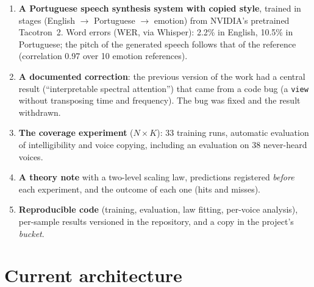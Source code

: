 \documentclass[a4paper,11pt]{article}
\begin{document}
\begin{enumerate}
\item \textbf{A Portuguese speech synthesis system with copied style}, trained in stages (English $\rightarrow$ Portuguese $\rightarrow$ emotion) from NVIDIA's pretrained Tacotron~2. Word errors (WER, via Whisper): 2.2\% in English, 10.5\% in Portuguese; the pitch of the generated speech follows that of the reference (correlation 0.97 over 10 emotion references).
\item \textbf{A documented correction}: the previous version of the work had a central result (``interpretable spectral attention'') that came from a code bug (a \texttt{view} without transposing time and frequency). The bug was fixed and the result withdrawn.
\item \textbf{The coverage experiment} ($N \times K$): 33 training runs, automatic evaluation of intelligibility and voice copying, including an evaluation on 38 never-heard voices.
\item \textbf{A theory note} with a two-level scaling law, predictions registered \emph{before} each experiment, and the outcome of each one (hits and misses).
\item \textbf{Reproducible code} (training, evaluation, law fitting, per-voice analysis), per-sample results versioned in the repository, and a copy in the project's \textit{bucket}.
\end{enumerate}

\section{Current architecture}
\end{document}
